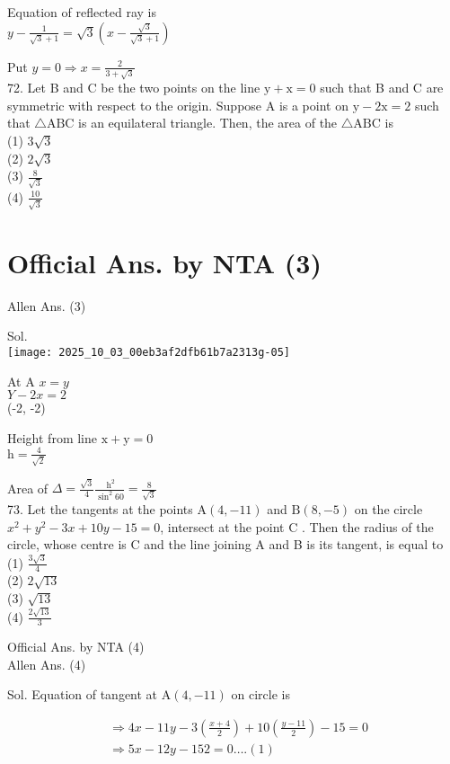 \documentclass[10pt]{article}
\begin{document}
Equation of reflected ray is\\
\(y-\frac{1}{\sqrt{3}+1}=\sqrt{3}\left(x-\frac{\sqrt{3}}{\sqrt{3}+1}\right)\)

Put \(y=0 \Rightarrow x=\frac{2}{3+\sqrt{3}}\)\\
72. Let B and C be the two points on the line \(\mathrm{y}+\mathrm{x}=0\) such that B and C are symmetric with respect to the origin. Suppose A is a point on \(\mathrm{y}-2 \mathrm{x}=2\) such that \(\triangle \mathrm{ABC}\) is an equilateral triangle. Then, the area of the \(\triangle \mathrm{ABC}\) is\\
(1) \(3 \sqrt{3}\)\\
(2) \(2 \sqrt{3}\)\\
(3) \(\frac{8}{\sqrt{3}}\)\\
(4) \(\frac{10}{\sqrt{3}}\)

\section*{Official Ans. by NTA (3)}
Allen Ans. (3)

Sol.\\
\texttt{[image: 2025\_10\_03\_00eb3af2dfb61b7a2313g-05]}

At A \(x=y\)\\
\(Y-2 x=2\)\\
(-2, -2)

Height from line \(\mathrm{x}+\mathrm{y}=0\)\\
\(\mathrm{h}=\frac{4}{\sqrt{2}}\)

Area of \(\Delta=\frac{\sqrt{3}}{4} \frac{\mathrm{~h}^{2}}{\sin ^{2} 60}=\frac{8}{\sqrt{3}}\)\\
73. Let the tangents at the points \(\mathrm{A}(4,-11)\) and \(\mathrm{B}(8,-5)\) on the circle \(x^{2}+y^{2}-3 x+10 y-15=0\), intersect at the point C . Then the radius of the circle, whose centre is C and the line joining A and B is its tangent, is equal to\\
(1) \(\frac{3 \sqrt{3}}{4}\)\\
(2) \(2 \sqrt{13}\)\\
(3) \(\sqrt{13}\)\\
(4) \(\frac{2 \sqrt{13}}{3}\)

Official Ans. by NTA (4)\\
Allen Ans. (4)

Sol. Equation of tangent at \(\mathrm{A}(4,-11)\) on circle is

\[
\begin{aligned}
& \Rightarrow 4 x-11 y-3\left(\frac{x+4}{2}\right)+10\left(\frac{y-11}{2}\right)-15=0 \\
& \Rightarrow 5 x-12 y-152=0 \ldots .(1)
\end{aligned}
\]
\end{document}
